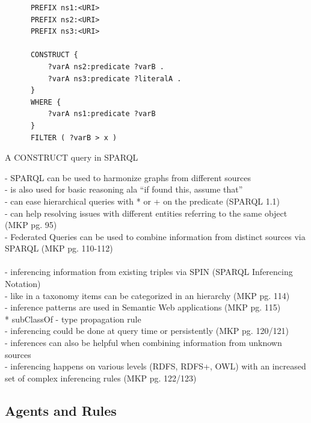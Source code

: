 \begin{listing}[H]
	\begin{verbatim}
	  PREFIX ns1:<URI>
	  PREFIX ns2:<URI>
	  PREFIX ns3:<URI>

	  CONSTRUCT {
	      ?varA ns2:predicate ?varB .
	      ?varA ns3:predicate ?literalA .
	  }
	  WHERE {
	      ?varA ns1:predicate ?varB
	  }
	  FILTER ( ?varB > x )
	\end{verbatim}
\caption{A CONSTRUCT query in \gls{SPARQL}}
\label{lst:construct_sparql}
\end{listing}

- SPARQL can be used to harmonize graphs from different sources \\
- is also used for basic reasoning ala ``if found this, assume that'' \\
- can ease hierarchical queries with * or + on the predicate (SPARQL 1.1) \\
- can help resolving issues with different entities referring to the same object (MKP pg. 95)\\
- Federated Queries can be used to combine information from distinct sources via SPARQL (MKP pg. 110-112)\\
\\
- inferencing information from existing triples via SPIN (SPARQL Inferencing Notation) \\
- like in a taxonomy items can be categorized in an hierarchy (MKP pg. 114) \\
- inference patterns are used in Semantic Web applications (MKP pg. 115) \\
   * subClassOf - type propagation rule \\
- inferencing could be done at query time or persistently (MKP pg. 120/121) \\
- inferences can also be helpful when combining information from unknown sources \\
- inferencing happens on various levels (RDFS, RDFS+, OWL) with an increased set of complex inferencing rules (MKP pg. 122/123)
\\

\subsection{Agents and Rules}
\label{sec:semantic_logic_rules}



